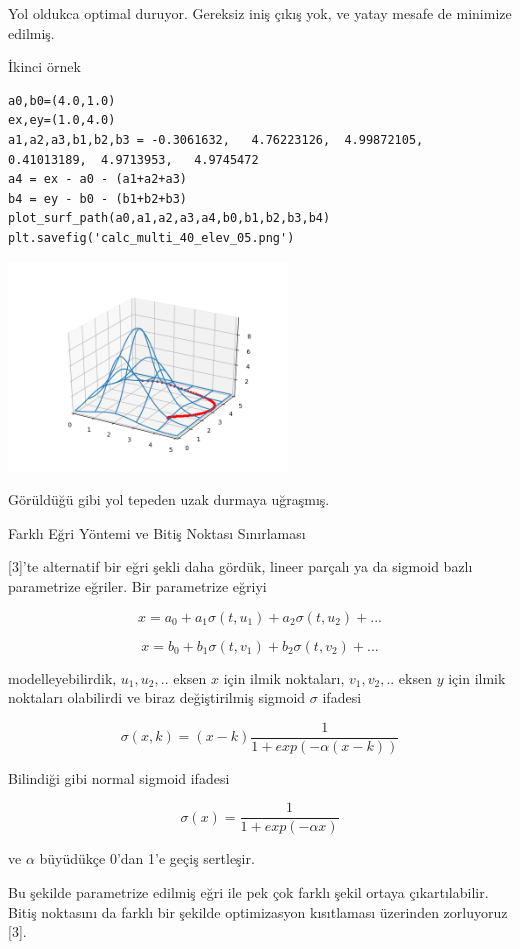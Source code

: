 \documentclass[12pt,fleqn]{article}\usepackage{../../common}
\begin{document}
Yol oldukca optimal duruyor. Gereksiz iniş çıkış yok, ve yatay mesafe de
minimize edilmiş. 

İkinci örnek 

\begin{verbatim}
a0,b0=(4.0,1.0)
ex,ey=(1.0,4.0)
a1,a2,a3,b1,b2,b3 = -0.3061632,   4.76223126,  4.99872105,  0.41013189,  4.9713953,   4.9745472 
a4 = ex - a0 - (a1+a2+a3)
b4 = ey - b0 - (b1+b2+b3)
plot_surf_path(a0,a1,a2,a3,a4,b0,b1,b2,b3,b4)
plt.savefig('calc_multi_40_elev_05.png')
\end{verbatim}

\includegraphics[width=20em]{calc_multi_40_elev_05.png}

Görüldüğü gibi yol tepeden uzak durmaya uğraşmış.

Farklı Eğri Yöntemi ve Bitiş Noktası Sınırlaması

[3]'te alternatif bir eğri şekli daha gördük, lineer parçalı ya da sigmoid
bazlı parametrize eğriler. Bir parametrize eğriyi 

$$
x = a_0 + a_1 \sigma(t,u_1) + a_2 \sigma(t,u_2) + ... 
$$

$$
x = b_0 + b_1 \sigma(t,v_1) + b_2 \sigma(t,v_2) + ... 
$$

modelleyebilirdik, $u_1,u_2,..$ eksen $x$ için ilmik noktaları,
$v_1,v_2,..$ eksen $y$ için ilmik noktaları olabilirdi ve biraz
değiştirilmiş sigmoid $\sigma$ ifadesi

$$
\sigma (x,k) = (x-k) \frac{1}{1 + exp(-\alpha (x-k))}
$$

Bilindiği gibi normal sigmoid ifadesi

$$
\sigma (x) = \frac{1}{1 + exp(-\alpha x)}
$$

ve $\alpha$ büyüdükçe 0'dan 1'e geçiş sertleşir. 

Bu şekilde parametrize edilmiş eğri ile pek çok farklı şekil ortaya
çıkartılabilir. Bitiş noktasını da farklı bir şekilde optimizasyon kısıtlaması
üzerinden zorluyoruz [3].
\end{document}

